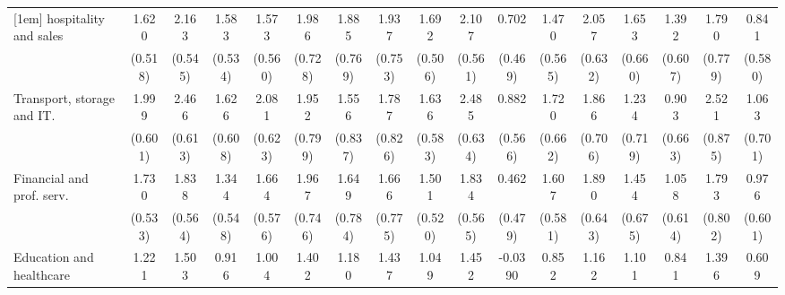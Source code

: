 {\begin{tabular}{l*{16}{c}}
[1em]
hospitality and sales&       1.620\sym{**} &       2.163\sym{***}&       1.583\sym{**} &       1.573\sym{**} &       1.986\sym{**} &       1.885\sym{*}  &       1.937\sym{*}  &       1.692\sym{***}&       2.107\sym{***}&       0.702         &       1.470\sym{**} &       2.057\sym{**} &       1.653\sym{*}  &       1.392\sym{*}  &       1.790\sym{*}  &       0.841         \\
                    &     (0.518)         &     (0.545)         &     (0.534)         &     (0.560)         &     (0.728)         &     (0.769)         &     (0.753)         &     (0.506)         &     (0.561)         &     (0.469)         &     (0.565)         &     (0.632)         &     (0.660)         &     (0.607)         &     (0.779)         &     (0.580)         \\
[1em]
Transport, storage and IT.&       1.999\sym{***}&       2.466\sym{***}&       1.626\sym{**} &       2.081\sym{***}&       1.952\sym{*}  &       1.556         &       1.787\sym{*}  &       1.636\sym{**} &       2.485\sym{***}&       0.882         &       1.720\sym{**} &       1.866\sym{**} &       1.234         &       0.903         &       2.521\sym{**} &       1.063         \\
                    &     (0.601)         &     (0.613)         &     (0.608)         &     (0.623)         &     (0.799)         &     (0.837)         &     (0.826)         &     (0.583)         &     (0.634)         &     (0.566)         &     (0.662)         &     (0.706)         &     (0.719)         &     (0.663)         &     (0.875)         &     (0.701)         \\
[1em]
Financial and prof. serv.&       1.730\sym{**} &       1.838\sym{**} &       1.344\sym{*}  &       1.664\sym{**} &       1.967\sym{**} &       1.649\sym{*}  &       1.666\sym{*}  &       1.501\sym{**} &       1.834\sym{**} &       0.462         &       1.607\sym{**} &       1.890\sym{**} &       1.454\sym{*}  &       1.058         &       1.793\sym{*}  &       0.976         \\
                    &     (0.533)         &     (0.564)         &     (0.548)         &     (0.576)         &     (0.746)         &     (0.784)         &     (0.775)         &     (0.520)         &     (0.565)         &     (0.479)         &     (0.581)         &     (0.643)         &     (0.675)         &     (0.614)         &     (0.802)         &     (0.601)         \\
[1em]
Education and healthcare&       1.221\sym{*}  &       1.503\sym{**} &       0.916         &       1.004         &       1.402         &       1.180         &       1.437         &       1.049\sym{*}  &       1.452\sym{*}  &     -0.0390         &       0.852         &       1.162         &       1.101         &       0.841         &       1.396         &       0.609         \\

\end{tabular}}
